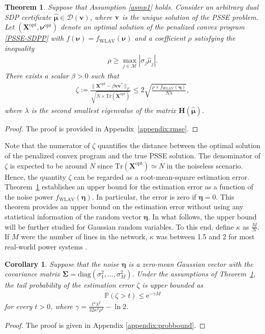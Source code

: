 \documentclass[journal,twoside]{IEEEtran}
\newtheorem{theorem}{Theorem}
\newtheorem{corollary}{Corollary}
\newcommand{\diag}{{\mathrm {diag}}}
\newcommand{\Tr}{\mathrm{Tr}}
\newcommand{\bX}{\mathbf{X}}
\newcommand{\bSigma}{\bm{\Sigma}}
\newcommand{\bnu}{\bm{\nu}}
\newcommand{\myexp}{\mathrm{e}}
\newcommand{\cM}{{\mathcal M}}
\begin{document}
\begin{theorem}\label{thm:rmse}
Suppose that  Assumption \ref{asmp1} holds. Consider an arbitrary dual SDP certificate $\hat{\boldsymbol{\mu}}\in\mathcal{D}(\mathbf{v})$, where $\bf v$ is the unique solution of the PSSE problem. Let $(\mathbf{X}^{\mathrm{opt}},\boldsymbol{\nu}^{\mathrm{opt}})$ denote an optimal solution of the penalized convex program \eqref{PSSE-SDPP} with $f(\bnu)=f_{\mathrm{WLAV}}(\bnu)$ and   a coefficient $\rho$ satisfying the inequality
\begin{align}\label{eq:rho}
\rho \geq \max_{j\in\cM} |\sigma_j\hat{\mu}_j|.
\end{align}  There exists a scalar $\beta >0$ such that
\begin{align} \label{rmse:Xopt}
\zeta := \frac{\|\mathbf{X}^{\mathrm{opt}}\! -\! \beta\mathbf{v}\mathbf{v}^{*}\|_F}{\sqrt{N\times \Tr({\bX}^{\mathrm{opt}})}}
\leq 2\sqrt{\frac{\rho \!\times\! f_{\mathrm{WLAV}}(\boldsymbol{\eta})}{N\lambda}},
\end{align}	
where $\lambda$ is the second smallest eigenvalue of the matrix $\mathbf{H}(\hat{\boldsymbol{\mu}})$.
\end{theorem}
\begin{proof}
The proof  is provided in  Appendix~\ref{appendix:rmse}.\end{proof}

Note that the numerator of $\zeta$ quantifies the distance between the optimal solution of the penalized convex program and the true PSSE solution.
The denominator of $\zeta$ is expected to be around $N$ since
$\Tr({\bX}^{\mathrm{opt}})\simeq N$ in the noiseless scenario.
Hence, the quantity $\zeta$ can be regarded as a root-mean-square estimation error.
Theorem~\ref{thm:rmse} establishes an upper bound for the estimation error as a function of the noise power
$f_{\mathrm{WLAV}}(\boldsymbol{\eta})$. In particular, the error is zero if $\boldsymbol{\eta}=0$.
This theorem provides an upper bound on the estimation error without using any statistical information of the random vector $\boldsymbol{\eta}$.
In what follows, the upper bound will be further studied for Gaussian random variables.
To this end, define $\kappa$ as $\frac{M}{N}$. If $M$ were the number of lines in the network, $\kappa$ was between 1.5 and 2 for most real-world power systems \cite{Chow13}.

\begin{corollary}\label{coro:probbound}
Suppose that the noise $\boldsymbol{\eta}$ is a zero-mean Gaussian vector with the covariance matrix $\bSigma = \diag(\sigma_1^2,...,\sigma_M^2)$.
Under the assumptions of Theorem~\ref{thm:rmse}, the tail probability of the estimation error $\zeta$ is upper bounded as
\begin{align}
\mathbb{P}(\zeta>t) \leq \myexp^{-\gamma M}
\end{align}
for every  $t>0$, where $\gamma = \frac{t^4\lambda^2}{32\kappa^2\rho^2}-\ln2$.
\end{corollary}
\begin{proof}
The proof is given in  Appendix \ref{appendix:probbound}.
\end{proof}
\end{document}
